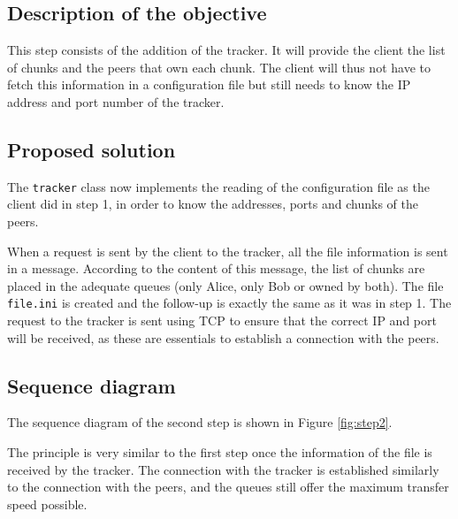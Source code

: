 \subsection{Description of the objective}

This step consists of the addition of the tracker. It will provide the client the list of chunks and the peers that own each chunk. The client will thus not have to fetch this information in a configuration file but still needs to know the IP address and port number of the tracker.

\subsection{Proposed solution}

The \texttt{tracker} class now implements the reading of the configuration file as the client did in step 1, in order to know the addresses, ports and chunks of the peers.

When a request is sent by the client to the tracker, all the file information is sent in a message. According to the content of this message, the list of chunks are placed in the adequate queues (only Alice, only Bob or owned by both). The file {\tt file.ini} is created and the follow-up is exactly the same as it was in step 1. The request to the tracker is sent using TCP to ensure that the correct IP and port will be received, as these are essentials to establish a connection with the peers.

\subsection{Sequence diagram}

The sequence diagram of the second step is shown in Figure \ref{fig:step2}.

The principle is very similar to the first step once the information of the file is received by the tracker. The connection with the tracker is established similarly to the connection with the peers, and the queues still offer the maximum transfer speed possible.

